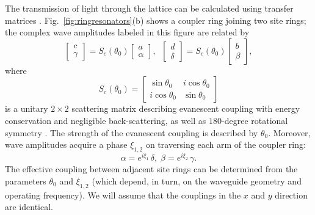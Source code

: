 \documentclass[aps,prx,twocolumn,superscriptaddress]{revtex4-1}
\begin{document}
The transmission of light through the lattice can be calculated using transfer matrices \cite{hafezi2011nphy,liang2013}.  Fig.~\ref{fig:ringresonators}(b) shows a coupler ring joining two site rings; the complex wave amplitudes labeled in this figure are related by
\begin{equation}
  \begin{bmatrix} c \\ \gamma \end{bmatrix}
  = S_c(\theta_0) \begin{bmatrix} a\\ \alpha \end{bmatrix}, \;\;
  \begin{bmatrix} d\\ \delta \end{bmatrix}
  = S_c(\theta_0) \begin{bmatrix} b \\ \beta \end{bmatrix},
\end{equation}
where
\begin{equation}
  S_c(\theta_0) = \begin{bmatrix}
    \sin\theta_0&i\cos\theta_0\\i\cos\theta_0&\sin\theta_0
  \end{bmatrix}
  \label{Sc}
\end{equation}
is a unitary $2\times2$ scattering matrix describing evanescent coupling with energy conservation and negligible back-scattering, as well as $180$-degree rotational symmetry \cite{hafezi2011nphy, liang2013, liang2014}.  The strength of the evanescent coupling is described by $\theta_0$.  Moreover, wave amplitudes acquire a phase $\xi_{1,2}$ on traversing each arm of the coupler ring:
\begin{equation}
  \alpha = e^{i\xi_1}\, \delta, \; \beta = e^{i\xi_2} \, \gamma.
\end{equation}
The effective coupling between adjacent site rings can be determined \cite{liang2013,liang2014,Pasek2014} from the parameters $\theta_0$ and $\xi_{1,2}$ (which depend, in turn, on the waveguide geometry and operating frequency).  We will assume that the couplings in the $x$ and $y$ direction are identical.
\end{document}
